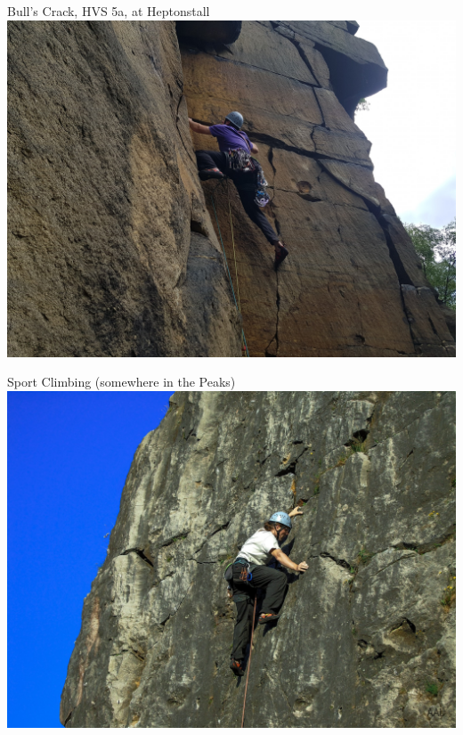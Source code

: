 \documentclass[fleqn]{beamer}
\begin{document}
\begin{frame}{Bull's Crack, HVS 5a, at Heptonstall}
  \includegraphics[height=\textheight]{bullscrack.jpg}

\end{frame}
\begin{frame}{Sport Climbing (somewhere in the Peaks)}
  \includegraphics[height=\textheight]{sportclimbing.jpg}

\end{frame}
\end{document}
